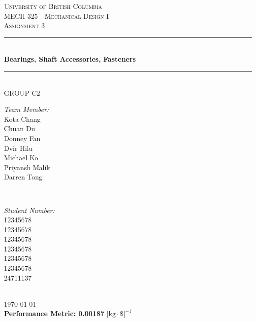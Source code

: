 \documentclass[letterpaper,12pt]{article}
\begin{document}
	
\begin{titlepage}
	
	\newcommand{\HRule}{\rule{\linewidth}{0.5mm}}
	
	\center
	
	\textsc{\LARGE University of British Columbia}\\[1.5cm]
	\textsc{\Large MECH 325 - Mechanical Design I}\\[0.5cm]
	\textsc{\Large Assignment 3}\\[0.5cm]
	
	\HRule \\[0.8cm]
	{ \huge \bfseries Bearings, Shaft Accessories, Fasteners}\\[0.4cm]
	\HRule \\[1cm]
	
	{\Large GROUP C2}\\
	\vspace{0.5cm}
	
	\begin{minipage}{0.4\textwidth}
		\begin{flushleft} \large
			\emph{Team Member:}\\
			Kota Chang\\
			Chuan Du\\
			Donney Fan\\
			Dvir Hilu\\
			Michael Ko\\
			Priyansh Malik\\
			Darren Tong\\
		\end{flushleft}
	\end{minipage}
	~
	\begin{minipage}{0.4\textwidth}
		\begin{flushright} \large
			\emph{Student Number:} \\
			12345678\\
			12345678\\
			12345678\\
			12345678\\
			12345678\\
			12345678\\
			24711137
			
		\end{flushright}
	\end{minipage}\\[2cm]
	
	{\large \today}\\[2cm]
	
	{\Large\textbf{
		Performance Metric: 0.00187$\text{ [kg}\cdot\text{\$]}^{-1}$
	}}
	
	
	\vfill %
	
\end{titlepage}
\end{document}

